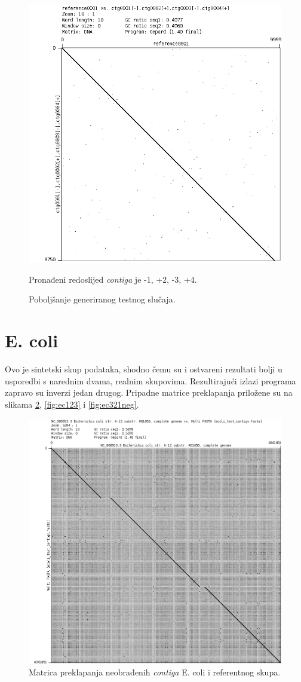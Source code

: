 \documentclass[times, utf8, seminar, numeric]{fer}
\begin{document}
\begin{figure}[h]
	\centering
	\centerline{\includegraphics[width=0.7\linewidth]{img/generated_reference}}
	\caption{Poboljšanje generiranog testnog slučaja.}
	\label{fig:generatedreference}
	\small
	Pronađeni redoslijed \textit{contiga} je -1, +2, -3, +4.
\end{figure}


\section{E. coli}
Ovo je sintetski skup podataka, shodno čemu su i ostvareni rezultati bolji u usporedbi s narednim dvama, realnim skupovima. Rezultirajući izlazi programa zapravo su inverzi jedan drugog. Pripadne matrice preklapanja priložene su na slikama \ref{fig:eccontigs}, \ref{fig:ec123} i \ref{fig:ec321neg}.

\begin{figure}[h]
	\centering
	\centerline{\includegraphics[width=0.7\linewidth]{img/ec_contigs}}
	\caption{Matrica preklapanja neobrađenih \textit{contiga} E. coli i referentnog skupa.}
	\label{fig:eccontigs}
\end{figure}
\end{document}
